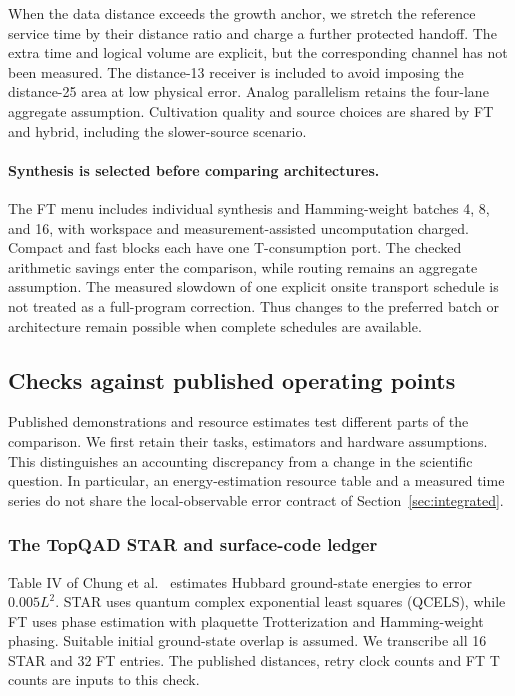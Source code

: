 \documentclass[11pt]{article}
\begin{document}
When the data distance exceeds the growth anchor, we stretch the reference
service time by their distance ratio and charge a further protected handoff.
The extra time and logical volume are explicit, but the corresponding channel
has not been measured. The distance-13 receiver is included to avoid imposing
the distance-25 area at low physical error. Analog parallelism retains the
four-lane aggregate assumption. Cultivation quality and source choices are
shared by FT and hybrid, including the slower-source scenario.

\paragraph{Synthesis is selected before comparing architectures.}
The FT menu includes individual synthesis and Hamming-weight batches 4, 8,
and 16, with workspace and measurement-assisted uncomputation charged.
Compact and fast blocks each have one T-consumption port. The checked
arithmetic savings enter the comparison, while routing remains an aggregate
assumption. The measured slowdown of one explicit onsite transport schedule
is not treated as a full-program correction. Thus changes to the preferred
batch or architecture remain possible when complete schedules are available.

\subsection{Checks against published operating points}\label{sec:published-benchmarks}
Published demonstrations and resource estimates test different parts of the
comparison. We first retain their tasks, estimators and hardware assumptions.
This distinguishes an accounting discrepancy from a change in the scientific
question. In particular, an energy-estimation resource table and a measured
time series do not share the local-observable error contract of
Section~\ref{sec:integrated}.

\subsubsection{The TopQAD STAR and surface-code ledger}
Table IV of Chung et al.~\cite{chung} estimates Hubbard ground-state energies
to error $0.005L^2$. STAR uses quantum complex exponential least squares
(QCELS), while FT uses phase estimation with plaquette Trotterization and
Hamming-weight phasing. Suitable initial ground-state overlap is assumed.
We transcribe all 16 STAR and 32 FT entries. The published distances, retry
clock counts and FT T counts are inputs to this check.
\end{document}
